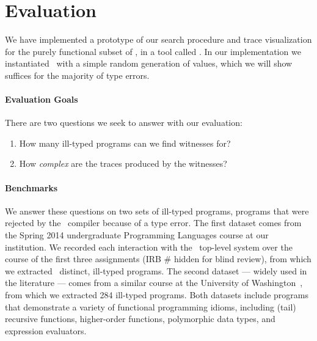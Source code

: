 \section{Evaluation}
\label{sec:evaluation}

We have implemented a prototype of our search procedure and trace
visualization for the purely functional subset of \ocaml, in a tool called \nanomaly.
In our implementation we instantiated \gensym\ with a simple random
generation of values, which we will show suffices for the
majority of type errors.

\paragraph{Evaluation Goals}
%
There are two questions we seek to answer with our evaluation:
%
\begin{enumerate}
\item {}
      How many ill-typed programs can we find witnesses for?
\item {}
      How \emph{complex} are the traces produced by the witnesses?
\end{enumerate}

\paragraph{Benchmarks}
We answer these questions on two sets of ill-typed programs, \ie
programs that were rejected by the \ocaml\ compiler because of a
type error.
%
The first dataset comes from the Spring 2014 undergraduate Programming
Languages course at our institution.
%
We recorded each interaction with the \ocaml\ top-level system over the
course of the first three assignments (IRB \# hidden for blind review), %
from which we extracted \ucsdsize\ distinct, ill-typed \ocaml programs.
%
The second dataset --- widely used in the literature --- comes from a
similar course at the University of Washington~\cite{lerner_seminal:_2006},
from which we extracted 284 ill-typed programs.
%
Both datasets include programs that demonstrate a variety of functional
programming idioms, including (tail) recursive functions, higher-order
functions, polymorphic data types, and expression evaluators.

